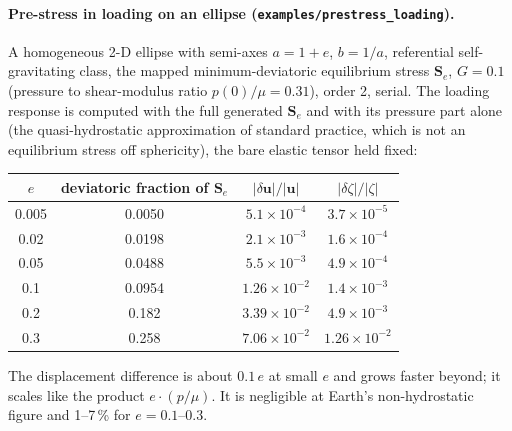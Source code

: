 \documentclass[11pt]{article}
\numberwithin{equation}{section}
\newcommand{\vu}{\mathbf{u}}
\newcommand{\code}[1]{\texttt{#1}}
\begin{document}
\paragraph{Pre-stress in loading on an ellipse
(\code{examples/prestress\_loading}).} A homogeneous 2-D ellipse with
semi-axes $a=1+e$, $b=1/a$, referential self-gravitating class, the
mapped minimum-deviatoric equilibrium stress $\mathbf S_e$, $G=0.1$
(pressure to shear-modulus ratio $p(0)/\mu=0.31$), order 2, serial. The
loading response is computed with the full generated $\mathbf S_e$ and
with its pressure part alone (the quasi-hydrostatic approximation of
standard practice, which is not an equilibrium stress off sphericity), the
bare elastic tensor held fixed:
\begin{center}
\small
\begin{tabular}{@{}cccc@{}}
\toprule
$e$ & deviatoric fraction of $\mathbf S_e$ & $|\delta\vu|/|\vu|$ & $|\delta\zeta|/|\zeta|$ \\
\midrule
0.005 & 0.0050 & $5.1\times10^{-4}$ & $3.7\times10^{-5}$ \\
0.02 & 0.0198 & $2.1\times10^{-3}$ & $1.6\times10^{-4}$ \\
0.05 & 0.0488 & $5.5\times10^{-3}$ & $4.9\times10^{-4}$ \\
0.1 & 0.0954 & $1.26\times10^{-2}$ & $1.4\times10^{-3}$ \\
0.2 & 0.182 & $3.39\times10^{-2}$ & $4.9\times10^{-3}$ \\
0.3 & 0.258 & $7.06\times10^{-2}$ & $1.26\times10^{-2}$ \\
\bottomrule
\end{tabular}
\end{center}
The displacement difference is about $0.1\,e$ at small $e$ and grows
faster beyond; it scales like the product $e\cdot(p/\mu)$. It is
negligible at Earth's non-hydrostatic figure and 1--7\,\% for
$e=0.1$--$0.3$.
\end{document}
